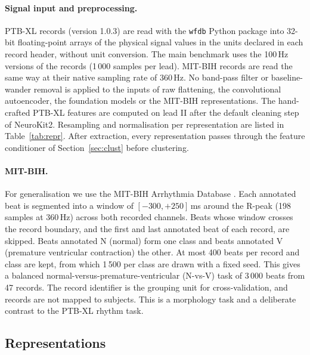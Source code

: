 \documentclass[preprint,11pt]{elsarticle}
\begin{document}
\paragraph{Signal input and preprocessing.} PTB-XL records (version 1.0.3) are read with
the \texttt{wfdb} Python package into 32-bit floating-point arrays of the physical signal
values in the units declared in each record header, without unit conversion. The main
benchmark uses the 100\,Hz versions of the records (1\,000 samples per lead). MIT-BIH
records are read the same way at their native sampling rate of 360\,Hz. No band-pass
filter or baseline-wander removal is applied to the inputs of raw flattening, the
convolutional autoencoder, the foundation models or the MIT-BIH representations. The
hand-crafted PTB-XL features are computed on lead II after the default cleaning step of
NeuroKit2. Resampling and normalisation per representation are listed in
Table~\ref{tab:repr}. After extraction, every representation passes through the feature
conditioner of Section~\ref{sec:clust} before clustering.

\paragraph{MIT-BIH.} For generalisation we use the MIT-BIH Arrhythmia Database
\cite{mitbih2001,physionet2000}. Each annotated beat is segmented into a window of
$[-300, +250]$\,ms around the R-peak (198 samples at 360\,Hz) across both recorded
channels. Beats whose window crosses the record boundary, and the first and last annotated
beat of each record, are skipped. Beats annotated N (normal) form one class and beats
annotated V (premature ventricular contraction) the other. At most 400 beats per record
and class are kept, from which 1\,500 per class are drawn with a fixed seed. This gives a
balanced normal-versus-premature-ventricular (N-vs-V) task of 3\,000 beats from 47
records. The record identifier is the grouping unit for cross-validation, and records are
not mapped to subjects. This is a morphology task and a deliberate contrast to the PTB-XL
rhythm task.

\subsection{Representations}\label{sec:repr}
\end{document}
